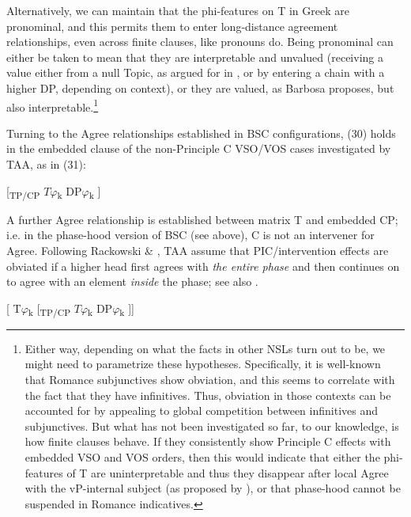\documentclass[output=paper]{langsci/langscibook}
\begin{document}
Alternatively, we can maintain that the phi-features on T in Greek are pronominal, and this permits them to enter long-distance agreement relationships, even across finite clauses, like pronouns do. Being pronominal can either be taken to mean that they are interpretable and unvalued (receiving a value either from a null Topic, as argued for in \citealt{Frascarelli2007}, or by entering a chain with a higher DP, depending on context), or they are valued, as Barbosa proposes, but also interpretable.\footnote{Either way, depending on what the facts in other NSLs turn out to be, we might need to parametrize these hypotheses. Specifically, it is well-known that Romance subjunctives show obviation, and this seems to correlate with the fact that they have infinitives. Thus, obviation in those contexts can be accounted for by appealing to global competition between infinitives and subjunctives. But what has not been investigated so far, to our knowledge, is how finite clauses behave. If they consistently show Principle C effects with embedded VSO and VOS orders, then this would indicate that either the phi-features of T are uninterpretable and thus they disappear after local Agree with the vP-internal subject (as proposed by \citealt{Barbosa2009}), or that phase-hood cannot be suspended in Romance indicatives.} 

Turning to the Agree relationships established in BSC configurations, (30) holds in the embedded clause of the non-Principle C VSO/VOS cases investigated by TAA, as in (31):

\ea%
    \label{ex:alexiadou:31}
     \textsubscript{} [\textsubscript{TP/CP}    $T\varphi $\textsubscript{k}    DP$\varphi $\textsubscript{k}  ] 
\z
       

A further Agree relationship is established between matrix T and embedded CP; i.e. in the phase-hood version of BSC (see above), C is not an intervener for Agree. Following Rackowski \& \citet{Richards2005}, TAA assume that PIC/intervention effects are obviated if a higher head first agrees with \textit{the entire phase} and then continues on to agree with an element \textit{inside} the phase; see also \citet{Halpert2016}. 

\ea%
    \label{ex:alexiadou:32}
    [   T$\varphi $\textsubscript{k} [\textsubscript{TP/CP}    $T\varphi $\textsubscript{k}    DP$\varphi $\textsubscript{k}  ]]      
\z
    
\end{document}
